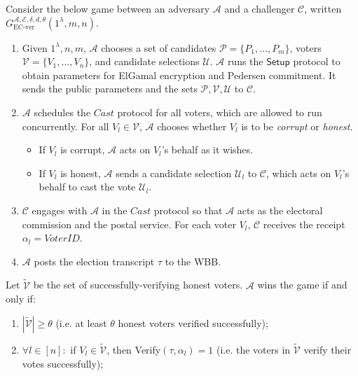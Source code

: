 \documentclass[12pt,a4paper]{article}
\theoremstyle{definition}
\newcommand{\VoterID}{\mathit{VoterID}}
\begin{document}
\begin{definition}[EC Verifiability]
    Consider the below game between an adversary $\mathcal{A}$ and a challenger $\mathcal{C}$, written $G_\text{EC-ver}^{\mathcal{A},\mathcal{E},\delta,d,\theta}(1^\lambda, m, n)$.
    \begin{enumerate}
        \item Given $1^\lambda, n, m$, $\mathcal{A}$ chooses a set of candidates $\mathcal{P}=\{P_1,\ldots,P_m\}$, voters $\mathcal{V}=\{V_1,\ldots,V_n\}$, and candidate selections $\mathcal{U}$. $\mathcal{A}$ runs the $\mathsf{Setup}$ protocol to obtain parameters for ElGamal encryption and Pedersen commitment. It sends the public parameters and the sets $\mathcal{P}, \mathcal{V}, \mathcal{U}$ to $\mathcal{C}$.
        
        \item $\mathcal{A}$ schedules the $\mathit{Cast}$ protocol for all voters, which are allowed to run concurrently. For all $V_l\in\mathcal{V}$, $\mathcal{A}$ chooses whether $V_l$ is to be \textit{corrupt} or \textit{honest}.
        \begin{itemize}
            \item If $V_l$ is corrupt, $\mathcal{A}$ acts on $V_l$'s behalf as it wishes.
            \item If $V_l$ is honest, $\mathcal{A}$ sends a candidate selection $\mathcal{U}_l$ to $\mathcal{C}$, which acts on $V_l$'s behalf to cast the vote $\mathcal{U}_l$.
        \end{itemize}

        \item $\mathcal{C}$ engages with $\mathcal{A}$ in the $\mathit{Cast}$ protocol so that $\mathcal{A}$ acts as the electoral commission and the postal service. For each voter $V_l$, $\mathcal{C}$ receives the receipt $\alpha_l=\VoterID$.

        \item $\mathcal{A}$ posts the election transcript $\tau$ to the WBB.
    \end{enumerate}
    Let $\tilde{\mathcal{V}}$ be the set of successfully-verifying honest voters. $\mathcal{A}$ wins the game if and only if:
    \begin{enumerate}
        \item $|\tilde{\mathcal{V}}| \geq \theta$ (i.e. at least $\theta$ honest voters verified successfully);
        \item $\forall l \in [n]:$ if $V_l \in \tilde{\mathcal{V}}$, then Verify$(\tau, \alpha_l) 	=1$ (i.e. the voters in $\tilde{\mathcal{V}}$ verify their votes successfully);
    

\end{enumerate}
\end{definition}
\end{document}
